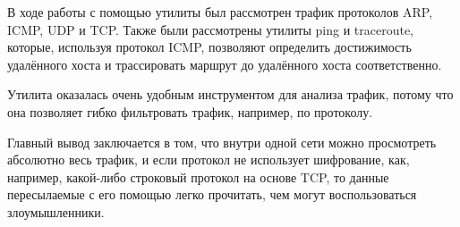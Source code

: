 В ходе работы с помощью утилиты  был рассмотрен трафик протоколов ARP, ICMP, UDP и TCP. Также были рассмотрены утилиты ping и traceroute, которые, используя протокол ICMP, позволяют определить достижимость удалённого хоста и трассировать маршрут до удалённого хоста соответственно.

Утилита  оказалась очень удобным инструментом для анализа трафик, потому что она позволяет гибко фильтровать трафик, например, по протоколу.

Главный вывод заключается в том, что внутри одной сети можно просмотреть абсолютно весь трафик, и если протокол не использует шифрование, как, например, какой-либо строковый протокол на основе TCP, то данные пересылаемые с его помощью легко прочитать, чем могут воспользоваться злоумышленники.


